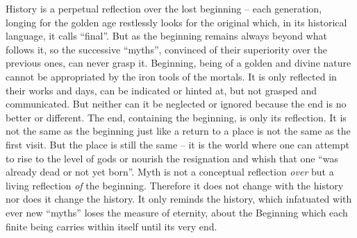 History is a perpetual 
reflection over the lost beginning -- each generation, longing for the golden age 
restlessly looks for the original which, in 
its historical language, it calls ``final''. But as the beginning remains always beyond
what follows it, so the successive ``myths'', convinced of their superiority over the
previous ones, can never grasp it. Beginning, being of a
golden and divine nature cannot be appropriated by the iron tools of the 
mortals. It is only reflected in their works and days, can be indicated or
hinted at, but not grasped and communicated. But neither can it be neglected or
ignored because the end is no better or different.
The end, containing the beginning, is only its reflection.
It is not the same as the beginning just like a return to a place is not the same as
the first visit. But the place is still the same -- it is the world where one can attempt 
to rise to the level of gods or nourish the resignation and whish that one ``was already 
dead or not yet born''.  
Myth is not a conceptual reflection {\em over} but a living reflection {\em of}
 the beginning. Therefore it does not change  with the history nor does it change the
history. It only reminds the history, which infatuated with ever new ``myths''
loses the measure of eternity,
about the Beginning which each finite being carries within itself until its very end.





